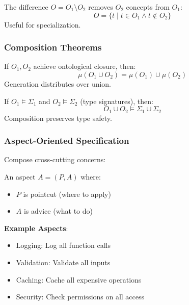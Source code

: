 \begin{definition}
    The difference $O = O_1 \setminus O_2$ removes $O_2$ concepts from $O_1$:
    \begin{equation}
        O = \{t \mid t \in O_1 \land t \notin O_2\}
    \end{equation}
    Useful for specialization.
\end{definition}

\subsubsection{Composition Theorems}

\begin{theorem}
    If $O_1, O_2$ achieve ontological closure, then:
    \begin{equation}
        \mu(O_1 \cup O_2) = \mu(O_1) \cup \mu(O_2)
    \end{equation}
    Generation distributes over union.
\end{theorem}

\begin{theorem}
    If $O_1 \models \Sigma_1$ and $O_2 \models \Sigma_2$ (type signatures), then:
    \begin{equation}
        O_1 \cup O_2 \models \Sigma_1 \cup \Sigma_2
    \end{equation}
    Composition preserves type safety.
\end{theorem}

\subsubsection{Aspect-Oriented Specification}

Compose cross-cutting concerns:

\begin{definition}
    An aspect $A = (P, A)$ where:
    \begin{itemize}
        \item $P$ is pointcut (where to apply)
        \item $A$ is advice (what to do)
    \end{itemize}
\end{definition}

\textbf{Example Aspects}:
\begin{itemize}
    \item Logging: Log all function calls
    \item Validation: Validate all inputs
    \item Caching: Cache all expensive operations
    \item Security: Check permissions on all access
\end{itemize}

